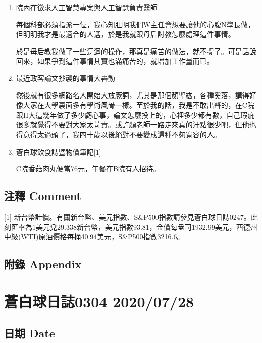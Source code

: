 \documentclass[
]{article}
\begin{document}
\begin{enumerate}
\def\labelenumi{\arabic{enumi}.}
\item
  院內在徵求人工智慧專案與人工智慧負責醫師

  每個科部必須指派一位，我心知肚明我們W主任會想要讓他的心腹N學長做，但明明我才是最適合的人選，於是我就跟母后討教怎麼處理這件事情。

  於是母后教我做了一些迂迴的操作，那真是痛苦的做法，就不提了。可是話說回來，如果爭到這件事情其實也滿痛苦的，就增加工作量而已。
\item
  最近政客論文抄襲的事情大轟動

  然後就有很多網路名人開始大放厥詞，尤其是那個顏聖紘，各種奚落，講得好像大家在大學裏面多有學術風骨一樣。至於我的話，我是不敢出聲的，在C院跟H大這幾年做了多少虧心事，論文怎麼投上的，心裡多少都有數，自己瑕疵很多就覺得不要對大家太苛責。或許顏老師一路走來真的汙點很少吧，但他也得意得太過頭了，我四十歲以後絕對不要變成這種不夠寬容的人。
\item
  蒼白球飲食誌暨物價筆記{[}1{]}

  C院香菇肉丸便當76元，午餐在B院有人招待。
\end{enumerate}

\hypertarget{ux6ce8ux91cb-comment-23}{%
\subsection{注釋 Comment}\label{ux6ce8ux91cb-comment-23}}

{[}1{]}
新台幣計價。有關新台幣、美元指數、S\&P500指數請參見蒼白球日誌0247。此刻匯率為1美元兌29.338新台幣，美元指數93.81，金價每盎司1932.99美元，西德州中級(WTI)原油價格每桶40.94美元，S\&P500指數3216.6。

\hypertarget{ux9644ux9304-appendix-23}{%
\subsection{附錄 Appendix}\label{ux9644ux9304-appendix-23}}

\hypertarget{ux84bcux767dux7403ux65e5ux8a8c0304-20200728}{%
\section{蒼白球日誌0304
2020/07/28}\label{ux84bcux767dux7403ux65e5ux8a8c0304-20200728}}

\hypertarget{ux65e5ux671f-date-24}{%
\subsection{日期 Date}\label{ux65e5ux671f-date-24}}
\end{document}
